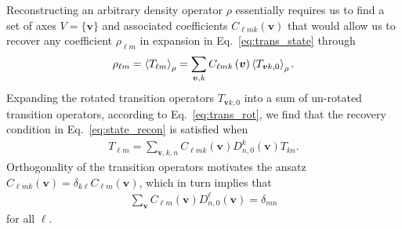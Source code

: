\documentclass[notitlepage,twocolumn]{revtex4-2}
\newcommand{\p}[1]{\left(#1\right)} %
\newcommand{\bk}{\Braket} %
\renewcommand{\v}{\bm} %
\renewcommand{\set}[1]{\{#1\}} %
\begin{document}
Reconstructing an arbitrary density operator $\rho$ essentially requires us to find a set of axes $V=\set{\v v}$ and associated coefficients $C_{\ell mk}\p{\v v}$ that would allow us to recover any coefficient $\rho_{\ell m}$ in expansion in Eq.~\eqref{eq:trans_state} through
\begin{align}
  \rho_{\ell m} = \bk{T_{\ell m}}_\rho
  = \sum_{\v v,k} C_{\ell mk}\p{\v v} \bk{T_{\v vk,0}}_\rho.
  \label{eq:state_recon}
\end{align}
Expanding the rotated transition operators $T_{\v vk,0}$ into a sum of un-rotated transition operators, according to Eq.~\eqref{eq:trans_rot}, we find that the recovery condition in Eq.~\eqref{eq:state_recon} is satisfied when
\begin{align}
  T_{\ell m}
  = \sum_{\v v,k,n} C_{\ell mk}\p{\v v} D^k_{n,0}\p{\v v} T_{kn}.
\end{align}
Orthogonality of the transition operators motivates the ansatz $C_{\ell mk}\p{\v v}=\delta_{k\ell}C_{\ell m}\p{\v v}$, which in turn implies that
\begin{align}
  \sum_{\v v} C_{\ell m}\p{\v v} D^\ell_{n,0}\p{\v v} = \delta_{mn}
  \label{eq:tomo_recovery}
\end{align}
for all $\ell$.
\end{document}
